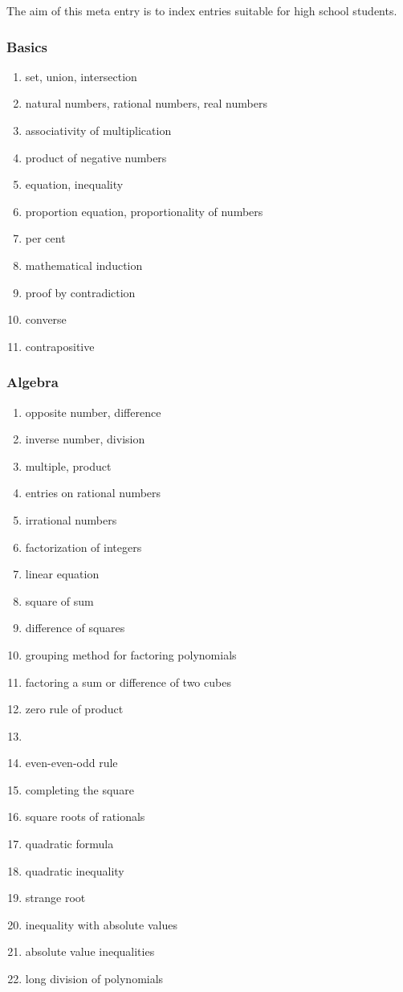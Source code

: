 \documentclass[12pt]{article}
\begin{document}

The aim of this meta entry is to index entries suitable for
high school students. 

\subsubsection*{Basics}
\begin{enumerate}
\item set, union, intersection
\item natural numbers, rational numbers, real numbers
\item associativity of multiplication
\item product of negative numbers
\item equation, inequality
\item proportion equation, proportionality of numbers
\item per cent
\item mathematical induction
\item proof by contradiction
\item converse
\item contrapositive
\end{enumerate}

\subsubsection*{Algebra}
\begin{enumerate}
\item opposite number, difference
\item inverse number, division
\item multiple, product 
\item entries on rational numbers
\item irrational numbers
\item factorization of integers
\item linear equation
\item square of sum
\item difference of squares
\item grouping method for factoring polynomials
\item factoring a sum or difference of two cubes
\item zero rule of product
\item {}
\item even-even-odd rule
\item completing the square
\item square roots of rationals
\item quadratic formula
\item quadratic inequality
\item strange root
\item inequality with absolute values
\item absolute value inequalities
\item long division of polynomials
\end{enumerate}
\end{document}

